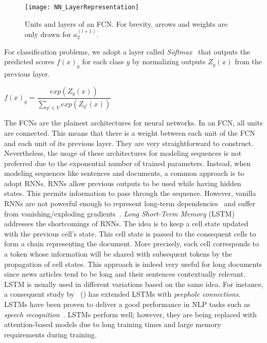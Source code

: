 \begin{figure}
    \centering
    \texttt{[image: NN\_LayerRepresentation]}
    \caption[Units and layers of an FCN.]{Units and layers of an FCN. For brevity, arrows and weights are only drawn for $a_2^{(l+1)}$.}
    \label{fig:NN_LayerRepresentation}
\end{figure}
For classification problems, we adopt a layer called \emph{Softmax}~\parencite{Softmax_Bridle} that outputs the predicted scores $f(x)_y$ for each class $y$ by normalizing outputs $Z_y(x)$ from the previous layer.\\
\begin{center}
    $f(x)_y = \dfrac{exp(Z_y(x))}{\sum\limits_{{y'} \in Y} exp(Z_{y'}(x))}$
\end{center}
The FCNs are the plainest architectures for neural networks. In an FCN, all units are connected. This means that there is a weight between each unit of the FCN and each unit of its previous layer. They are very straightforward to construct. Nevertheless, the usage of these architectures for modeling sequences is not preferred due to the exponential number of trained parameters. Instead, when modeling sequences like sentences and documents, a common approach is to adopt RNNs. RNNs allow previous outputs to be used while having hidden states. This permits information to pass through the sequence. However, vanilla RNNs are not powerful enough to represent long-term dependencies~\parencite{LearningLongTermDependenciesHard_Bengio} and suffer from vanishing/exploding gradients~\parencite{OnTheDifficultyOfTrainingRNNs_Pascanu}. \emph{Long Short-Term Memory} (LSTM)~\parencite{LSTM_Hochreiter} addresses the shortcomings of RNNs. The idea is to keep a cell state updated with the previous cell's state. This cell state is passed to the consequent cells to form a chain representing the document. More precisely, each cell corresponds to a token whose information will be shared with subsequent tokens by the propagation of cell states. This approach is indeed very useful for long documents since news articles tend to be long and their sentences contextually relevant. LSTM is usually used in different variations based on the same idea. For instance, a consequent study by~\citeauthor{LSTMPeephole_Gers} (\citeyear{LSTMPeephole_Gers}) has extended LSTMs with \emph{peephole connections}. LSTMs have been proven to deliver a good performance in NLP tasks such as \emph{speech recognition}~\parencite{AchievingHumanParityinConvSR_Wayne}. LSTMs perform well; however, they are being replaced with attention-based models due to long training times and large memory requirements during training.\\
